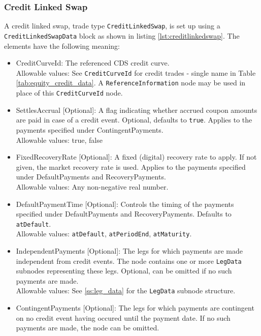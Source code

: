 \subsubsection{Credit Linked Swap}

A credit linked swap, trade type \lstinline!CreditLinkedSwap!, is set up using a \lstinline!CreditLinkedSwapData! block
as shown in listing \ref{lst:creditlinkedswap}. The elements have the following meaning:

\begin{itemize}
\item CreditCurveId: The referenced CDS credit curve. \\
  Allowable values: See \lstinline!CreditCurveId! for credit trades - single name in Table
  \ref{tab:equity_credit_data}. A \lstinline!ReferenceInformation! node may be used in place of this
  \lstinline!CreditCurveId! node.
\item SettlesAccrual [Optional]: A flag indicating whether accrued coupon amounts are paid in case of a credit
  event. Optional, defaults to \verb+true+. Applies to the payments specified under ContingentPayments.\\
  Allowable values: true, false
\item FixedRecoveryRate [Optional]: A fixed (digital) recovery rate to apply. If not given, the market recovery rate
  is used. Applies to the payments specified under DefaultPayments and RecoveryPayments.\\
  Allowable values: Any non-negative real number.
\item DefaultPaymentTime [Optional]: Controls the timing of the payments specified under DefaultPayments and
  RecoveryPayments. Defaults to \lstinline!atDefault!. \\
  Allowable values: \lstinline!atDefault!, \lstinline!atPeriodEnd!, \lstinline!atMaturity!.
\item IndependentPayments [Optional]: The legs for which payments are made independent from credit events. The node contains one or
  more \lstinline!LegData! subnodes representing these legs. Optional, can be omitted if no such payments are made. \\
  Allowable values: See \ref{ss:leg_data} for the \lstinline!LegData! subnode structure.
\item ContingentPayments [Optional]: The legs for which payments are contingent on no credit event having occured until
  the payment date. If no such payments are made, the node can be omitted. \\

\end{itemize}

